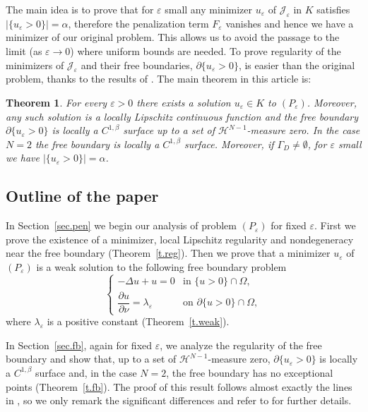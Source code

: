 \documentclass[11pt]{amsart}
\newtheorem{theorem}{Theorem}[section]
\theoremstyle{definition}
\theoremstyle{remark}
\numberwithin{equation}{section}
\newcommand{\cH}{\mathcal{H}}
\newcommand{\cJ}{\mathcal{J}}
\begin{document}
The main idea is to prove that for $\varepsilon$ small any minimizer $u_\varepsilon$ of $\cJ_\varepsilon$ in $K$ satisfies $|\{u_\varepsilon>0\}|=\alpha$, therefore the penalization term $F_\varepsilon$ vanishes and hence we have a minimizer of our original problem. This allows us to avoid the passage to the limit (as $\varepsilon\to0$) where uniform bounds are needed. To prove regularity of the minimizers of $\cJ_\varepsilon$ and their free boundaries, $\partial\{u_\varepsilon>0\}$, is easier than the original problem, thanks to the results of \cite{AC}. The main theorem in this article is:

\begin{theorem}\label{t.main}
For every $\varepsilon>0$ there exists a solution $u_\varepsilon\in K$ to $(P_\varepsilon)$. Moreover, any such solution is a locally Lipschitz continuous function and the free boundary $\partial\{u_\varepsilon>0\}$ is locally a $C^{1,\beta}$ surface up to a set of $\cH^{N-1}$-measure zero. In the case $N=2$ the free boundary is locally a $C^{1,\beta}$ surface. Moreover, if $\Gamma_D\neq\emptyset$, for $\varepsilon$ small we have $|\{u_\varepsilon>0\}|=\alpha$.
\end{theorem}

\subsection*{Outline of the paper}
In Section~\ref{sec.pen} we begin our analysis of problem $(P_\varepsilon)$ for fixed $\varepsilon$. First we prove the existence of a minimizer, local Lipschitz regularity and nondegeneracy near the free boundary (Theorem~\ref{t.reg}). Then we prove that a minimizer $u_\varepsilon$ of $(P_\varepsilon)$ is a weak solution to the following free boundary problem
\[
\begin{cases}
-\Delta u+u=0 & \text{in }\{u>0\}\cap\Omega,\\[2pt]
\dfrac{\partial u}{\partial\nu}=\lambda_\varepsilon & \text{on }\partial\{u>0\}\cap\Omega,
\end{cases}
\]
where $\lambda_\varepsilon$ is a positive constant (Theorem~\ref{t.weak}).

In Section~\ref{sec.fb}, again for fixed $\varepsilon$, we analyze the regularity of the free boundary and show that, up to a set of $\cH^{N-1}$-measure zero, $\partial\{u_\varepsilon>0\}$ is locally a $C^{1,\beta}$ surface and, in the case $N=2$, the free boundary has no exceptional points (Theorem~\ref{t.fb}). The proof of this result follows almost exactly the lines in \cite{AC}, so we only remark the significant differences and refer to \cite{AC} for further details.
\end{document}
